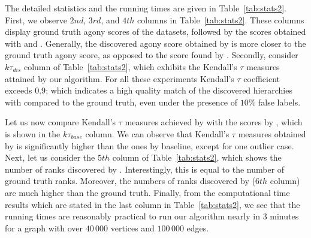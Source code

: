 The detailed statistics and the running times  are given in Table~\ref{tab:stats2}.
First, we observe  $2nd$, $3rd$, and $4th$ columns in Table~\ref{tab:stats2}. These columns display  ground truth agony scores of the datasets, followed by the scores obtained with \algpartition and  \algexact.
Generally, the discovered agony score obtained by \algpartition is  more closer to the ground truth agony score, as opposed to the  score found by  \algexact.
Secondly, consider  $k\tau_{dis}$ column of Table~\ref{tab:stats2}, which exhibits the Kendall's $\tau$ measures attained by our algorithm. For all these experiments Kendall's $\tau$ coefficient  exceeds $0.9$; which indicates a high quality match of the discovered hierarchies with compared to the ground truth, even under the presence of $10\%$ false labels. 

Let us now compare Kendall's $\tau$ measures achieved by \algpartition with the scores by \algexact, which is shown in the $k\tau_{base}$ column.
We can observe that Kendall's $\tau$ measures obtained by \algpartition is significantly higher than the ones by baseline, except for one outlier case.
Next, let us consider  the $5th$ column of Table~\ref{tab:stats2}, which shows the number of ranks discovered by \algpartition. Interestingly, this is equal to the number of ground truth ranks.
Moreover, the numbers of ranks discovered by \algexact ($6th$ column) are  much higher than the ground truth.
Finally, from the
computational time results which are stated in the last column in Table~\ref{tab:stats2}, we see that the running times
are  reasonably practical to run our algorithm nearly in $3$ minutes for a graph with over $40\,000$ vertices and $100\,000$ edges.
 



